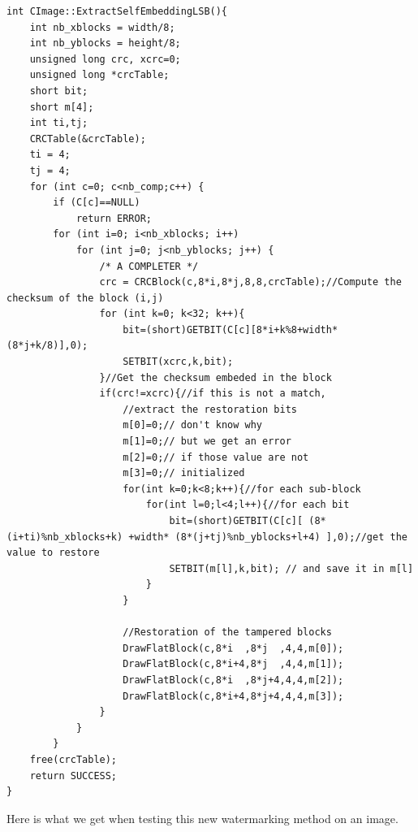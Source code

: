 \documentclass[11pt, oneside]{article}   	%
\begin{document}
\begin{lstlisting}
int CImage::ExtractSelfEmbeddingLSB(){
	int nb_xblocks = width/8;
	int nb_yblocks = height/8;
	unsigned long crc, xcrc=0;
	unsigned long *crcTable;
	short bit;
	short m[4];
	int ti,tj;
	CRCTable(&crcTable);
	ti = 4;
	tj = 4;
	for (int c=0; c<nb_comp;c++) {
		if (C[c]==NULL)
			return ERROR;	
		for (int i=0; i<nb_xblocks; i++)
			for (int j=0; j<nb_yblocks; j++) {
				/* A COMPLETER */
				crc = CRCBlock(c,8*i,8*j,8,8,crcTable);//Compute the checksum of the block (i,j)
				for (int k=0; k<32; k++){
					bit=(short)GETBIT(C[c][8*i+k%8+width*(8*j+k/8)],0);
					SETBIT(xcrc,k,bit);
				}//Get the checksum embeded in the block
				if(crc!=xcrc){//if this is not a match,
					//extract the restoration bits
					m[0]=0;// don't know why 
					m[1]=0;// but we get an error
					m[2]=0;// if those value are not
					m[3]=0;// initialized 	
					for(int k=0;k<8;k++){//for each sub-block
						for(int l=0;l<4;l++){//for each bit
							bit=(short)GETBIT(C[c][ (8*(i+ti)%nb_xblocks+k) +width* (8*(j+tj)%nb_yblocks+l+4) ],0);//get the value to restore
							SETBIT(m[l],k,bit); // and save it in m[l]
						}
					}
					
					//Restoration of the tampered blocks
					DrawFlatBlock(c,8*i  ,8*j  ,4,4,m[0]);
					DrawFlatBlock(c,8*i+4,8*j  ,4,4,m[1]);
					DrawFlatBlock(c,8*i  ,8*j+4,4,4,m[2]);
					DrawFlatBlock(c,8*i+4,8*j+4,4,4,m[3]);
				}
			}
		}
	free(crcTable);
	return SUCCESS;
}
\end{lstlisting}
Here is what we get when testing this new watermarking method on an image.
\end{document}
